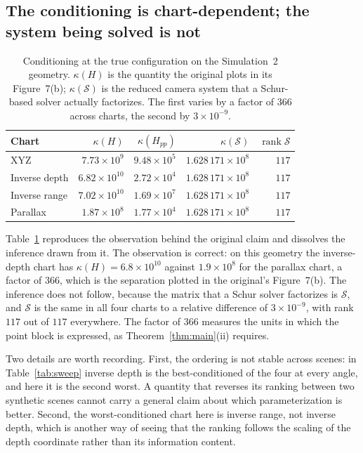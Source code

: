 \documentclass[11pt,a4paper]{article}
\theoremstyle{definition}
\theoremstyle{remark}
\begin{document}
\subsection{The conditioning is chart-dependent; the system being solved is not}
\begin{table}[t]
\centering
\caption{Conditioning at the true configuration on the Simulation~2 geometry. $\kappa(H)$ is the quantity the original plots in its Figure~7(b); $\kappa(\mathcal S)$ is the reduced camera system that a Schur-based solver actually factorizes. The first varies by a factor of $366$ across charts, the second by $3\times10^{-9}$.}
\label{tab:repro-cond}
\small
\begin{tabular}{lrrrr}
\toprule
Chart & $\kappa(H)$ & $\kappa(H_{pp})$ & $\kappa(\mathcal S)$ & $\operatorname{rank}\mathcal S$\\
\midrule
XYZ & $7.73\times10^{9}$ & $9.48\times10^{5}$ & $1.628\,171\times10^{8}$ & $117$\\
Inverse depth & $6.82\times10^{10}$ & $2.72\times10^{4}$ & $1.628\,171\times10^{8}$ & $117$\\
Inverse range & $7.02\times10^{10}$ & $1.69\times10^{7}$ & $1.628\,171\times10^{8}$ & $117$\\
Parallax & $1.87\times10^{8}$ & $1.77\times10^{4}$ & $1.628\,171\times10^{8}$ & $117$\\
\bottomrule
\end{tabular}
\end{table}

Table~\ref{tab:repro-cond} reproduces the observation behind the original claim and dissolves the inference drawn from it. The observation is correct: on this geometry the inverse-depth chart has $\kappa(H)=6.8\times10^{10}$ against $1.9\times10^{8}$ for the parallax chart, a factor of $366$, which is the separation plotted in the original's Figure~7(b). The inference does not follow, because the matrix that a Schur solver factorizes is $\mathcal S$, and $\mathcal S$ is the same in all four charts to a relative difference of $3\times10^{-9}$, with rank $117$ out of $117$ everywhere. The factor of $366$ measures the units in which the point block is expressed, as Theorem~\ref{thm:main}(ii) requires.

Two details are worth recording. First, the ordering is not stable across scenes: in Table~\ref{tab:sweep} inverse depth is the best-conditioned of the four at every angle, and here it is the second worst. A quantity that reverses its ranking between two synthetic scenes cannot carry a general claim about which parameterization is better. Second, the worst-conditioned chart here is inverse range, not inverse depth, which is another way of seeing that the ranking follows the scaling of the depth coordinate rather than its information content.
\end{document}
